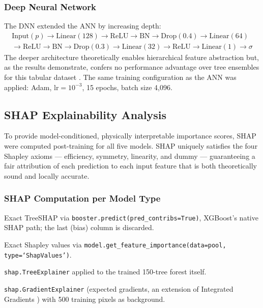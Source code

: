 \documentclass[12pt, a4paper]{article}
\begin{document}
\subsubsection{Deep Neural Network}
The DNN extended the ANN by increasing depth:
\begin{multline}
    \text{Input}(p) \to \text{Linear}(128) \to \text{ReLU} \to \text{BN} \to \text{Drop}(0.4) \to \text{Linear}(64) \\
    \to \text{ReLU} \to \text{BN} \to \text{Drop}(0.3) \to \text{Linear}(32) \to \text{ReLU} \to \text{Linear}(1) \to \sigma
\end{multline}
The deeper architecture theoretically enables hierarchical feature abstraction but, as the results demonstrate, confers no performance advantage over tree ensembles for this tabular dataset \citep{grinsztajn2022, shwartzziv2022}. The same training configuration as the ANN was applied: Adam, $\text{lr} = 10^{-3}$, 15 epochs, batch size 4,096.

\subsection{SHAP Explainability Analysis}
\label{sec:shap_method}

To provide model-conditioned, physically interpretable importance scores, SHAP \citep{lundberg2017, lundberg2020} were computed post-training for all five models. SHAP uniquely satisfies the four Shapley axioms --- efficiency, symmetry, linearity, and dummy \citep{shapley1953} --- guaranteeing a fair attribution of each prediction to each input feature that is both theoretically sound and locally accurate.

\subsubsection{SHAP Computation per Model Type}

\begin{description}[style=nextline, align=left]
  \item[\textbf{XGBoost:}] Exact TreeSHAP via \texttt{booster.predict(pred\_contribs=True)}, XGBoost's native SHAP path; the last (bias) column is discarded.

  \item[\textbf{CatBoost:}] Exact Shapley values via \texttt{model.get\_feature\_importance(data=pool, type=`ShapValues')}.

  \item[\textbf{RandomForest:}] \texttt{shap.TreeExplainer} \citep{lundberg2020} applied to the trained 150-tree forest itself.

  \item[\textbf{ANN and DNN:}] \texttt{shap.GradientExplainer} (expected gradients, an extension of Integrated Gradients \citep{Sundararajan2017}) with 500 training pixels as background.
\end{description}
\end{document}

